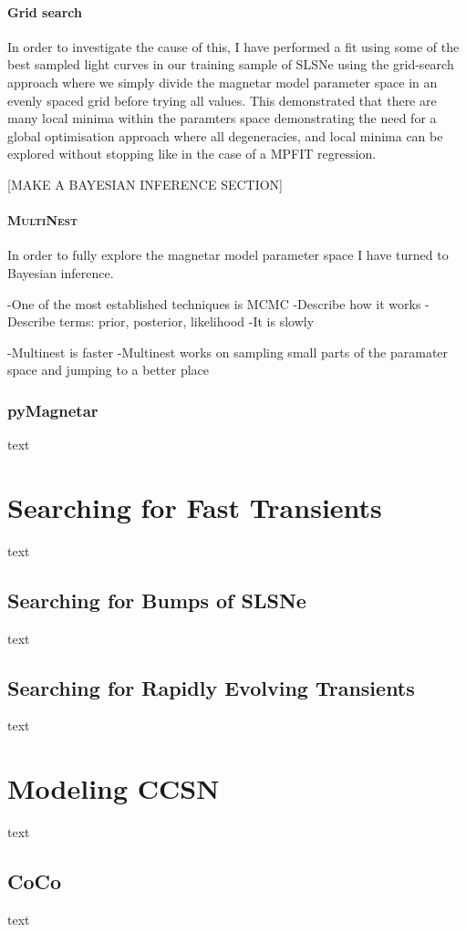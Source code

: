 \paragraph{Grid search}
In order to investigate the cause of this, I have performed a fit using some of the best sampled light curves in our training sample of SLSNe using the grid-search approach where we simply divide the magnetar model parameter space in an evenly spaced grid before trying all values. This demonstrated that there are many local minima within the paramters space demonstrating the need for a global optimisation approach where all degeneracies, and local minima can be explored without stopping like in the case of a MPFIT regression.

[MAKE A BAYESIAN INFERENCE SECTION]
\paragraph{\textsc{MultiNest}}
In order to fully explore the magnetar model parameter space I have turned to Bayesian inference.

-One of the most established techniques is MCMC
-Describe how it works
-Describe terms: prior, posterior, likelihood
-It is slowly

-Multinest is faster
-Multinest works on sampling small parts of the paramater space and jumping to a better place

\subsubsection{pyMagnetar}
text

\section{Searching for Fast Transients}
text
\subsection{Searching for Bumps of SLSNe}
text
\subsection{Searching for Rapidly Evolving Transients}
text

\section{Modeling CCSN}
text
\subsection{CoCo}
text
